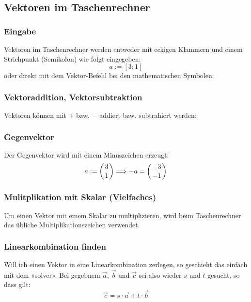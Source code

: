 \subsection{Vektoren im Taschenrechner}

\subsubsection{Eingabe}
Vektoren im Taschenrechner werden entweder mit eckigen Klammern und
einem Strichpunkt (Semikolon) wie folgt eingegeben:
$$a := [3; 1]$$
oder direkt mit dem Vektor-Befehl bei den mathematischen Symbolen:


\subsubsection{Vektoraddition, Vektorsubtraktion}
Vektoren können mit $+$ bzw. $-$ addiert bzw. subtrahiert
werden:

\subsubsection{Gegenvektor}
Der Gegenvektor wird mit einem Minuszeichen erzeugt:
$$a:=\left(3\atop 1\right) \Longrightarrow -a = \left( -3 \atop
-1\right)$$
\newpage

\subsubsection{Mulitplikation mit Skalar (Vielfaches)}

Um einen Vektor mit einem Skalar zu multiplizieren, wird beim
Taschenrechner das übliche Multiplikationszeichen verwendet.



\subsubsection{Linearkombination finden}
Will ich einen Vektor in eine Linearkombination
 zerlegen, so geschieht das einfach mit dem
«solver». Bei gegebnem $\vec{a}$, $\vec{b}$ und $\vec{c}$ sei also
wieder $s$ und $t$ gesucht, so dass gilt:
$$\vec{c} = s\cdot{}\vec{a} + t\cdot{}\vec{b}$$

